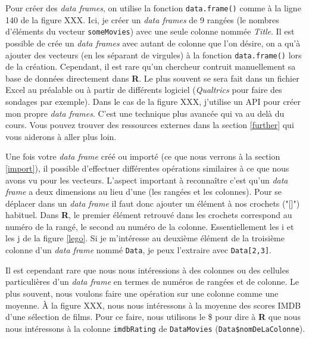 \documentclass[10.5pt,a4paper]{article}
\begin{document}
    Pour créer des \emph{data frames}, on utilise la fonction \texttt{data.frame()} comme à la ligne 140 de la figure XXX. Ici, je créer un \emph{data frames} de 9 rangées (le nombres d'éléments du vecteur \texttt{someMovies}) avec une seule colonne nommée \emph{Title}. Il est possible de crée un \emph{data frames} avec autant de colonne que l'on désire, on a qu'à ajouter des vecteurs (en les séparant de virgules) à la fonction \texttt{data.frame()} lors de la création. Cependant, il est rare qu'un chercheur contruit manuellement sa base de données directement dans \textbf{R}. Le plus souvent se sera fait dans un fichier Excel au préalable ou à partir de différents logiciel (\textit{Qualtrics} pour faire des sondages par exemple). Dans le cas de la figure XXX, j'utilise un API pour créer mon propre \emph{data frames}. C'est une technique plus avancée qui va au delà du cours. Vous pouvez trouver des ressources externes dans la section \ref{further} qui vous aiderons à aller plus loin. 
    
    Une fois votre \emph{data frame} créé ou importé (ce que nous verrons à la section \ref{import}), il possible d'effectuer différentes opérations similaires à ce que nous avons vu pour les vecteurs. L'aspect important à reconnaître c'est qu'un \emph{data frame} a deux dimensions au lieu d'une (les rangées et les colonnes). Pour se déplacer dans un \emph{data frame} il faut donc ajouter un élément à nos crochets ("[]") habituel. Dans \textbf{R}, le premier élément retrouvé dans les crochets correspond au numéro de la rangé, le second au numéro de la colonne. Essentiellement les i et les j de la figure \ref{lego}. Si je m'intéresse au deuxième élément de la troisième colonne d'un \emph{data frame} nommé \texttt{Data}, je peux l'extraire avec \texttt{Data[2,3]}.
    
    Il est cependant rare que nous nous intéressions à des colonnes ou des cellules particulières d'un \emph{data frame} en termes de numéros de rangées et de colonne. Le plus souvent, nous voulons faire une opération sur une colonne comme une moyenne. À la figure XXX, nous nous intéressons à la moyenne des scores IMDB d'une sélection de films. Pour ce faire, nous utilisons le \$ pour dire à \textbf{R} que nous nous intéressons à la colonne \texttt{imdbRating} de \texttt{DataMovies} (\texttt{Data\$nomDeLaColonne}).
    
\end{document}
